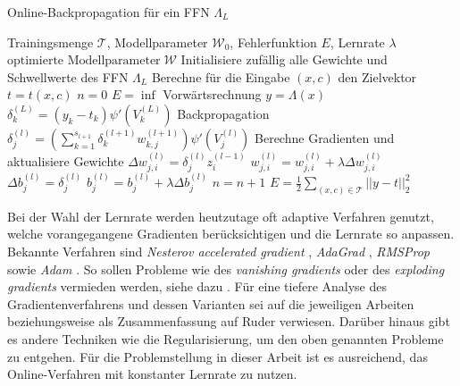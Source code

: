 \begin{algorithm}[h]
    \caption{Online-Backpropagation für ein FFN $\Lambda_L$}
    \label{alg:online_backprop}
    \begin{algorithmic}
    \Require  Trainingsmenge $\mathcal{T}$, Modellparameter $\mathcal{W}_0$, Fehlerfunktion $E$, Lernrate $\lambda$ 
    \Ensure $\text{optimierte Modellparameter} \; \mathcal{W}$
    \State Initialisiere zufällig alle Gewichte und Schwellwerte des FFN $\Lambda_L$ 
    \State Berechne für die Eingabe $(x,c)$ den Zielvektor $t=t(x,c)$
    \State $n=0$  
    \State $E=\inf$
     
        \State Vorwärtsrechnung $y=\Lambda(x)$
            \State $\delta_k^{(L)}=(y_k-t_k) \psi'(V^{(L)}_k)$
        \EndFor
        \State Backpropagation
                \State $\delta^{(l)}_j= \left(\sum_{k=1}^{s_{l+1}} \delta_k^{(l+1)} w^{(l+1)}_{k,j}\right) \psi'(V^{(l)}_j)$
             \EndFor
        \EndFor 
        \State Berechne Gradienten und aktualisiere Gewichte
        \State $\Delta w_{j,i}^{(l)}= \delta_j^{(l)} z^{(l-1)}_i$
        \State $w^{(l)}_{j,i}= w^{(l)}_{j,i} + \lambda \Delta w_{j,i}^{(l)}$
        \EndFor
        \State $\Delta b^{(l)}_j=\delta^{(l)}_j$
        \State $b^{(l)}_j=b^{(l)}_j + \lambda \Delta b^{(l)}_j$
        \EndFor
        \EndFor
        \State $n=n+1$
    \EndFor
    \State $E=\frac{1}{2} \sum_{(x,c) \in \mathcal{T}} ||y-t||_2^2$
    \EndWhile
    \end{algorithmic}
\end{algorithm}


Bei der Wahl der Lernrate werden heutzutage oft adaptive Verfahren genutzt, welche vorangegangene Gradienten berücksichtigen und die Lernrate so anpassen. Bekannte Verfahren sind \textit{Nesterov accelerated
gradient} \cite{sutskever2013importance}, \textit{AdaGrad} \cite{duchi2011adaptive}, \textit{RMSProp} \cite{tieleman2012lecture} sowie \textit{Adam} \cite{Kingma2015AdamAM}. So sollen Probleme wie des \textit{vanishing gradients} oder des \textit{exploding gradients} vermieden werden, siehe dazu \cite{hanin2018neural}.
Für eine tiefere Analyse des Gradientenverfahrens und dessen Varianten sei auf die jeweiligen Arbeiten beziehungsweise als Zusammenfassung auf Ruder \cite{ruder2016overview,} verwiesen. Darüber hinaus gibt es andere Techniken wie die Regularisierung, um den oben genannten Probleme zu entgehen.
Für die Problemstellung in dieser Arbeit ist es ausreichend, das Online-Verfahren mit konstanter Lernrate zu nutzen. 


